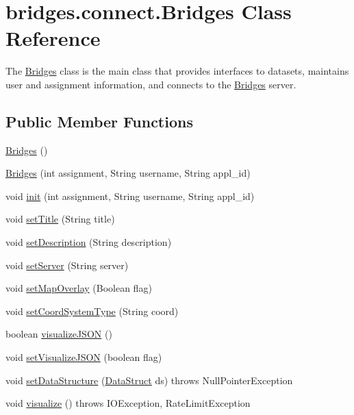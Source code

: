 \hypertarget{classbridges_1_1connect_1_1_bridges}{}\section{bridges.\+connect.\+Bridges Class Reference}
\label{classbridges_1_1connect_1_1_bridges}


The \hyperlink{classbridges_1_1connect_1_1_bridges}{Bridges} class is the main class that provides interfaces to datasets, maintains user and assignment information, and connects to the \hyperlink{classbridges_1_1connect_1_1_bridges}{Bridges} server.  


\subsection*{Public Member Functions}
\begin{DoxyCompactItemize}
\item 
\hyperlink{classbridges_1_1connect_1_1_bridges_a42f0592841a829f93453506c78951b1f}{Bridges} ()
\item 
\hyperlink{classbridges_1_1connect_1_1_bridges_a4c47eb7cbb94c5810dc38c38760db872}{Bridges} (int assignment, String username, String appl\+\_\+id)
\item 
void \hyperlink{classbridges_1_1connect_1_1_bridges_a87aa73367a43cfc8b3ae5e4926ea4895}{init} (int assignment, String username, String appl\+\_\+id)
\item 
void \hyperlink{classbridges_1_1connect_1_1_bridges_aed3752ee6318a48dff271d9a9e2a8fcc}{set\+Title} (String title)
\item 
void \hyperlink{classbridges_1_1connect_1_1_bridges_a50d1d5aa64d312393b63d1be854e34a2}{set\+Description} (String description)
\item 
void \hyperlink{classbridges_1_1connect_1_1_bridges_ab43e412448e1dfc340e58c407519a576}{set\+Server} (String server)
\item 
void \hyperlink{classbridges_1_1connect_1_1_bridges_a4af383ba2f114ad7bd4e08eb44096973}{set\+Map\+Overlay} (Boolean flag)
\item 
void \hyperlink{classbridges_1_1connect_1_1_bridges_ade4a9c43e2b608e6b3dc774b73f95749}{set\+Coord\+System\+Type} (String coord)
\item 
boolean \hyperlink{classbridges_1_1connect_1_1_bridges_afd3c63780396e92c94c923037385b31d}{visualize\+J\+S\+O\+N} ()
\item 
void \hyperlink{classbridges_1_1connect_1_1_bridges_aa502aa32a9ac482da9c8455c6810b64d}{set\+Visualize\+J\+S\+O\+N} (boolean flag)
\item 
void \hyperlink{classbridges_1_1connect_1_1_bridges_a921a6603b2445b1abe30a1b3d6f0c255}{set\+Data\+Structure} (\hyperlink{classbridges_1_1base_1_1_data_struct}{Data\+Struct} ds)  throws Null\+Pointer\+Exception 
\item 
void \hyperlink{classbridges_1_1connect_1_1_bridges_a1853d64ffb8675ba2ec227a2b819cd24}{visualize} ()  throws I\+O\+Exception, Rate\+Limit\+Exception 
\end{DoxyCompactItemize}
